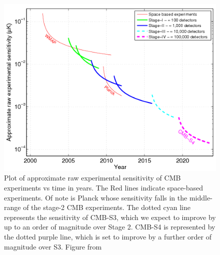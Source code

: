 \begin{figure}[h]
\centering
\includegraphics[scale=0.75]{images/experiments.png} 
\caption{Plot of approximate raw experimental sensitivity of CMB experiments vs time in years. The Red lines indicate space-based experiments. Of note is Planck whose sensitivity falls in the middle-range of the stage-2 CMB experiments. The dotted cyan line represents the sensitivity of CMB-S3, which we expect to improve by up to an order of magnitude over Stage 2. CMB-S4 is represented by the dotted purple line, which is set to improve by a further order of magnitude over S3. Figure from \cite{Abazajian:2013oma}}
\end{figure}
